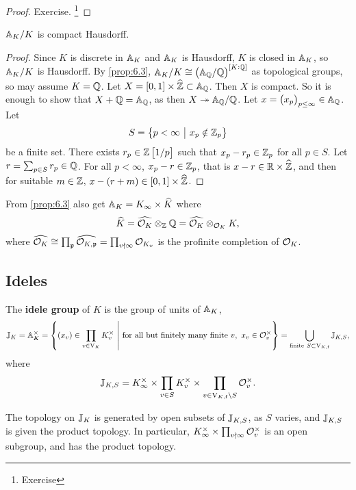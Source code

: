 \begin{proof}
Exercise. \footnote{Exercise}
\end{proof}

\begin{theorem}
$ \AA_K / K $ is compact Hausdorff.
\end{theorem}

\begin{proof}
Since $ K $ is discrete in $ \AA_K $ and $ \AA_K $ is Hausdorff, $ K $ is closed in $ \AA_K $, so $ \AA_K / K $ is Hausdorff. By \ref{prop:6.3}, $ \AA_K / K \cong \br{\AA_\QQ / \QQ}^{\sbr{K : \QQ}} $ as topological groups, so may assume $ K = \QQ $. Let $ X = \sbr{0, 1} \times \widehat{\ZZ} \subset \AA_\QQ $. Then $ X $ is compact. So it is enough to show that $ X + \QQ = \AA_\QQ $, as then $ X \twoheadrightarrow \AA_\QQ / \QQ $. Let $ x = \br{x_p}_{p \le \infty} \in \AA_\QQ $. Let
$$ S = \cbr{p < \infty \st x_p \notin \ZZ_p} $$
be a finite set. There exists $ r_p \in \ZZ\sbr{1 / p} $ such that $ x_p - r_p \in \ZZ_p $ for all $ p \in S $. Let $ r = \sum_{p \in S} r_p \in \QQ $. For all $ p < \infty $, $ x_p - r \in \ZZ_p $, that is $ x - r \in \RR \times \widehat{\ZZ} $, and then for suitable $ m \in \ZZ $, $ x - \br{r + m} \in \sbr{0, 1} \times \widehat{\ZZ} $.
\end{proof}

From \ref{prop:6.3} also get $ \AA_K = K_\infty \times \widehat{K} $ where
$$ \widehat{K} = \widehat{\OOO_K} \otimes_\ZZ \QQ = \widehat{\OOO_K} \otimes_{\OOO_K} K, $$
where $ \widehat{\OOO_K} \cong \prod_\ppp \widehat{\OOO_{K, \ppp}} = \prod_{v \nmid \infty} \OOO_{K_v} $ is the profinite completion of $ \OOO_K $.

\subsection{Ideles}

\begin{definition*}
The \textbf{idele group} of $ K $ is the group of units of $ \AA_K $,
$$ \JJ_K = \AA_K^\times = \cbr{\br{x_v} \in \prod_{v \in \V_K} K_v^\times \st \text{for all but finitely many finite} \ v, \ x_v \in \OOO_v^\times} = \bigcup_{\text{finite} \ S \subset \V_{K, \f}} \JJ_{K, S}, $$
where
$$ \JJ_{K, S} = K_\infty^\times \times \prod_{v \in S} K_v^\times \times \prod_{v \in \V_{K, \f} \setminus S} \OOO_v^\times. $$
\end{definition*}

The topology on $ \JJ_K $ is generated by open subsets of $ \JJ_{K, S} $, as $ S $ varies, and $ \JJ_{K, S} $ is given the product topology. In particular, $ K_\infty^\times \times \prod_{v \nmid \infty} \OOO_v^\times $ is an open subgroup, and has the product topology.

